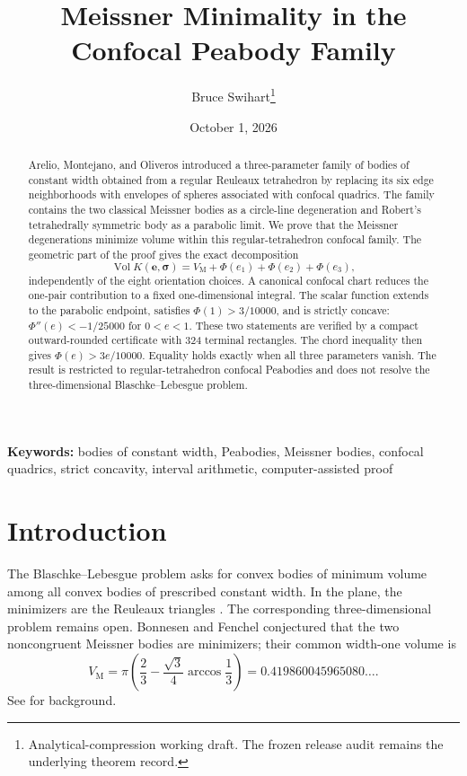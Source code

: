 \documentclass[11pt]{article}
\title{Meissner Minimality in the Confocal Peabody Family}
\author{Bruce Swihart\thanks{Analytical-compression working draft. The frozen release audit remains the underlying theorem record.}}
\date{October 1, 2026}
\numberwithin{equation}{section}
\theoremstyle{remark}
\newcommand{\Vol}{\operatorname{Vol}}
\newcommand{\VM}{V_{\mathrm M}}
\begin{document}
\maketitle

\begin{abstract}
Arelio, Montejano, and Oliveros introduced a three-parameter family of bodies of constant width obtained from a regular Reuleaux tetrahedron by replacing its six edge neighborhoods with envelopes of spheres associated with confocal quadrics. The family contains the two classical Meissner bodies as a circle-line degeneration and Robert's tetrahedrally symmetric body as a parabolic limit. We prove that the Meissner degenerations minimize volume within this regular-tetrahedron confocal family. The geometric part of the proof gives the exact decomposition
\[
  \Vol K(\mathbf e,\boldsymbol\sigma)
  =\VM+\Phi(e_1)+\Phi(e_2)+\Phi(e_3),
\]
independently of the eight orientation choices. A canonical confocal chart reduces the one-pair contribution to a fixed one-dimensional integral. The scalar function extends to the parabolic endpoint, satisfies \(\Phi(1)>3/10000\), and is strictly concave: \(\Phi''(e)<-1/25000\) for \(0<e<1\). These two statements are verified by a compact outward-rounded certificate with 324 terminal rectangles. The chord inequality then gives \(\Phi(e)>3e/10000\). Equality holds exactly when all three parameters vanish. The result is restricted to regular-tetrahedron confocal Peabodies and does not resolve the three-dimensional Blaschke--Lebesgue problem.
\end{abstract}

\noindent\textbf{Keywords:} bodies of constant width, Peabodies, Meissner bodies, confocal quadrics, strict concavity, interval arithmetic, computer-assisted proof

\section{Introduction}

The Blaschke--Lebesgue problem asks for convex bodies of minimum volume among all convex bodies of prescribed constant width. In the plane, the minimizers are the Reuleaux triangles \cite{Blaschke1915,Lebesgue1914}. The corresponding three-dimensional problem remains open. Bonnesen and Fenchel conjectured that the two noncongruent Meissner bodies are minimizers; their common width-one volume is
\begin{equation}
  \VM
  =\pi\left(\frac23-\frac{\sqrt3}{4}\arccos\frac13\right)
  =0.419860045965080\ldots .
  \label{eq:meissner-volume}
\end{equation}
See \cite{KawohlWeber2011,MartiniMontejanoOliveros2019,Nishioka2026} for background.
\end{document}
